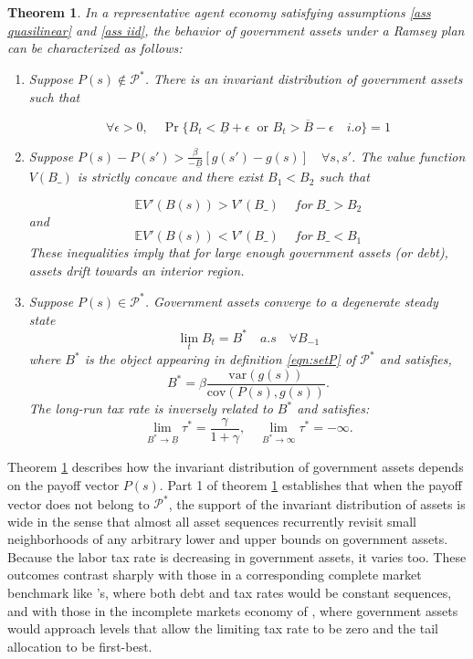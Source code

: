 \documentclass[thmsb,11pt]{article}
\newtheorem{theorem}{Theorem}
\newcommand{\var}{\mathrm{var}}
\newcommand{\cov}{\mathrm{cov}}
\begin{document}
\begin{theorem}
\label{thm: rep agent general theorem}
In a representative agent economy satisfying assumptions \ref{ass quasilinear} and \ref{ass iid}, the behavior of  government assets under a Ramsey plan
can be characterized as follows:
\begin{enumerate}
 \item Suppose $P(s) \not \in \mathcal{P}^*$.  There is an invariant distribution of government assets such that

\[\forall \epsilon>0, \quad \Pr\{B_t<\underline{B}+\epsilon  \ \text{ or } B_t>\overline{B}-\epsilon \quad i.o \}=1\]

\item Suppose  $P(s)-P(s')>\frac{\beta}{-\underline{B}}[g(s')-g(s)]\quad \forall s,s'$.
The value function $V(B\_)$ is strictly concave and there exist $B_1<B_2$ such that

\[\mathbb{E}V'(B(s))>V'(B\_) \quad \ for \ B\_>B_2 \]
and
\[\mathbb{E}V'(B(s))<V'(B\_) \quad \ for \  B\_<B_1 \]
These inequalities imply that for large enough government assets (or debt),
assets drift towards an interior region. %
\item Suppose $P(s)\in \mathcal{P}^*$.  Government assets converge to a degenerate steady state
\[\lim_tB_t=  B^*\quad a.s \quad \forall B_{-1} \]
where $B^*$ is the object appearing in definition \eqref{eqn:setP} of $\mathcal{P}^*$ and satisfies,
\begin{equation} \label{ss-debt} B^*=\beta \frac{\var(g(s))}{\cov(P(s),g(s))}. \end{equation}
The long-run tax rate is inversely related to $B^*$ and satisfies:
\[\lim_{B^*\to\underline{B}}\tau^*=\frac{\gamma}{1+\gamma}, \quad \lim_{B^*\to\infty}\tau^*=-\infty .\]

\end{enumerate}


\end{theorem}


\color{black}
Theorem \ref{thm: rep agent general theorem}  describes how  the invariant distribution of government assets depends on the payoff vector $P(s)$.
Part 1 of theorem \ref{thm: rep agent general theorem}  establishes that when the payoff vector does  not belong to $\mathcal{P}^*$, the support of the invariant distribution of assets is wide in the sense that almost all
asset sequences recurrently revisit  small neighborhoods of  any arbitrary lower and upper bounds on government assets.
Because the labor tax rate is decreasing in government assets, it varies too. These outcomes contrast sharply with those   in a corresponding complete market benchmark
like \citeauthor{LucasJr.1983}'s, where both debt and tax rates would be constant  sequences,  and with those in the incomplete markets economy of  \citeauthor{Aiyagari2002},
  where government assets would approach levels that allow the  limiting tax rate to be zero and the tail allocation to be first-best.
\end{document}
